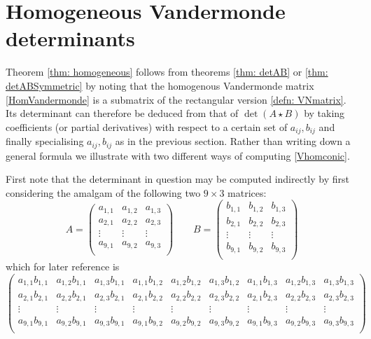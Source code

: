 \documentclass[10pt]{amsart}
\theoremstyle{definition}
\theoremstyle{remark}
\numberwithin{equation}{section}
\newcommand{\0}{\color{blue}{\mathsf{0}}}
\begin{document}
\section{Homogeneous Vandermonde determinants}
Theorem \ref{thm: homogeneous} follows from theorems \ref{thm: detAB} or \ref{thm: detABSymmetric} by noting that the homogenous Vandermonde matrix  \eqref{HomVandermonde} is a submatrix of the rectangular version \eqref{defn: VNmatrix}. Its determinant can therefore be deduced from that of $\det (A \star B)$ by taking coefficients (or partial derivatives) with respect to a certain set of $a_{ij}, b_{ij}$ and finally specialising $a_{ij}, b_{ij}$ as in the previous section. Rather than writing down a general formula we illustrate with two different ways of computing \eqref{Vhomconic}.


First note that the determinant in question may be computed indirectly  by  first considering the amalgam   of the following two $9 \times 3$ matrices:
\[ A =  \begin{pmatrix} a_{1,1} & a_{1,2} & a_{1,3} \\ 
a_{2,1} & a_{2,2} & a_{2,3} \\ 
     \vdots & \vdots & \vdots \\ 
      a_{9,1} & a_{9,2} & a_{9,3} \\ 
        \end{pmatrix} \qquad    B= \begin{pmatrix} b_{1,1} & b_{1,2} & b_{1,3} \\ 
        b_{2,1} & b_{2,2} & b_{2,3} \\ 
     \vdots & \vdots & \vdots \\ 
      b_{9,1} & b_{9,2} & b_{9,3} \\ 
        \end{pmatrix}    \]
which for later reference is 
\[    \begin{pmatrix} a_{1,1} b_{1,1} & a_{1,2} b_{1,1} & a_{1,3} b_{1,1} & 
a_{1,1} b_{1,2} & a_{1,2} b_{1,2} & a_{1,3} b_{1,2} &
a_{1,1} b_{1,3} & a_{1,2} b_{1,3} & a_{1,3} b_{1,3} \\
a_{2,1} b_{2,1} & a_{2,2} b_{2,1} & a_{2,3} b_{2,1} & 
a_{2,1} b_{2,2} & a_{2,2} b_{2,2} & a_{2,3} b_{2,2} &
a_{2,1} b_{2,3} & a_{2,2} b_{2,3} & a_{2,3} b_{2,3} \\
     \vdots &  \vdots&\vdots&\vdots&\vdots&\vdots&\vdots&\vdots&\vdots \\ 
  a_{9,1} b_{9,1} & a_{9,2} b_{9,1} & a_{9,3} b_{9,1} & 
a_{9,1} b_{9,2} & a_{9,2} b_{9,2} & a_{9,3} b_{9,2} &
a_{9,1} b_{9,3} & a_{9,2} b_{9,3} & a_{9,3} b_{9,3} \\
        \end{pmatrix}\]
        
\end{document}
